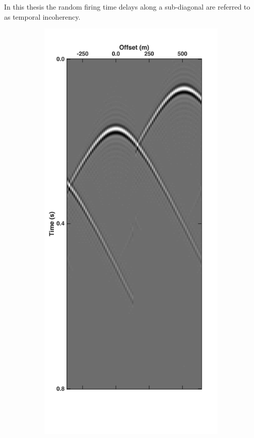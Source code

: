 In this thesis the random firing time delays along a sub-diagonal are referred to as temporal incoherency.  

\begin{figure}
	\centering
	\begin{subfigure}[b]{0.3\textwidth}
		\centering
		\includegraphics[width = \textwidth]{Plots/Mahdad/25iter/TimeDelay/Pseudo-DeblendedCRG_rec30_coh}

\end{subfigure}
\end{figure}
